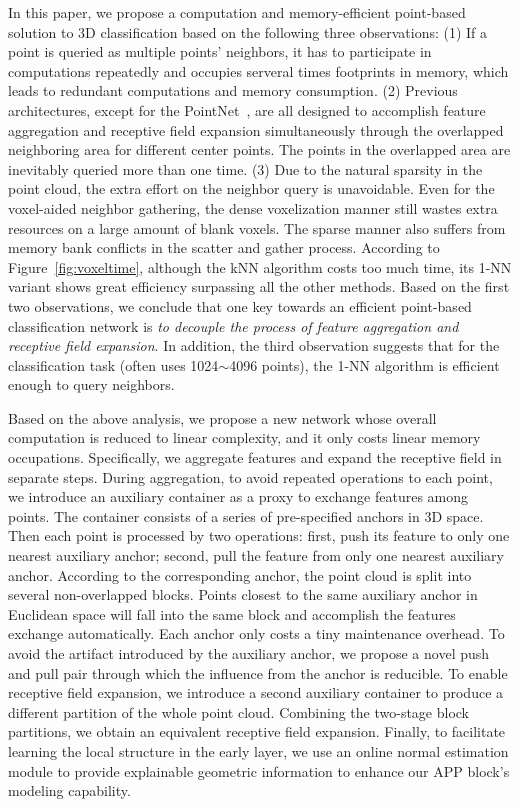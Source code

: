 \documentclass[journal]{IEEEtran}
\begin{document}
In this paper, we propose a computation and memory-efficient point-based solution to 3D classification based on the following three observations: (1) If a point is queried as multiple points' neighbors, it has to participate in computations repeatedly and occupies serveral times footprints in memory, which leads to redundant computations and memory consumption. (2) Previous architectures, except for the PointNet~\cite{PointNet}, are all designed to accomplish feature aggregation and receptive field expansion simultaneously through the overlapped neighboring area for different center points. The points in the overlapped area are inevitably queried more than one time. (3) Due to the natural sparsity in the point cloud, the extra effort on the neighbor query is unavoidable. Even for the voxel-aided neighbor gathering, the dense voxelization manner still wastes extra resources on a large amount of blank voxels. The sparse manner also suffers from memory bank conflicts in the scatter and gather process. According to Figure~\ref{fig:voxeltime}, although the kNN algorithm costs too much time, its 1-NN variant shows great efficiency surpassing all the other methods. Based on the first two observations, we conclude that one key towards an efficient point-based classification network is {\em to decouple the process of feature aggregation and receptive field expansion}. In addition,  the third observation suggests that for the classification task (often uses 1024$\sim$4096 points), the 1-NN algorithm is efficient enough to query neighbors. 

 Based on the above analysis, we propose a new network whose overall computation is reduced to linear complexity, and it only costs linear memory occupations. Specifically, we aggregate features and expand the receptive field in separate steps. During aggregation, to avoid repeated operations to each point, we introduce an auxiliary container as a proxy to exchange features among points. The container consists of a series of pre-specified anchors in 3D space. Then each point is processed by two operations: first, push its feature to only one nearest auxiliary anchor; second, pull the feature from only one nearest auxiliary anchor. According to the corresponding anchor, the point cloud is split into several non-overlapped blocks. Points closest to the same auxiliary anchor in Euclidean space will fall into the same block and accomplish the features exchange automatically. Each anchor only costs a tiny maintenance overhead. To avoid the artifact introduced by the auxiliary anchor, we propose a novel push and pull pair through which the influence from the anchor is reducible. To enable receptive field expansion, we introduce a second auxiliary container to produce a different partition of the whole point cloud. Combining the two-stage block partitions, we obtain an equivalent receptive field expansion. Finally, to facilitate learning the local structure in the early layer, we use an online normal estimation module to provide explainable geometric information to enhance our APP block's modeling capability. 
 
\end{document}
